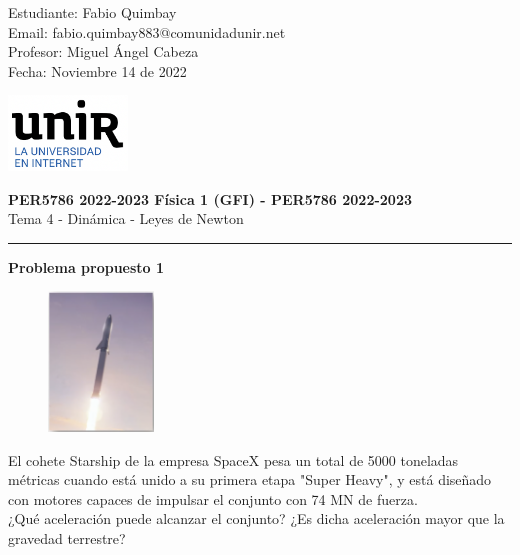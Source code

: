 \documentclass[11pt,letterpaper]{article}
\begin{document}
\pagestyle{plain}

\begin{flushleft}
Estudiante: Fabio Quimbay\\
Email: fabio.quimbay883@comunidadunir.net\\
Profesor: Miguel Ángel Cabeza\\
Fecha: Noviembre 14 de 2022\\
\end{flushleft}

\begin{flushright}\vspace{-20mm}
\includegraphics[height=2cm]{logo.png}
\end{flushright}
 
\begin{center}\vspace{0cm}
\textbf{\large PER5786 2022-2023  Física 1 (GFI) - PER5786 2022-2023}\\
 Tema 4 - Dinámica - Leyes de Newton
\end{center}

 
\rule{\linewidth}{0.1mm}

\bigskip
\bigskip

\textbf{Problema propuesto 1}\\

\begin{figure}
\begin{center}
\includegraphics[width=0.25\textwidth]{problema_1.png}
\end{center}
\end{figure}

El cohete Starship  de la empresa SpaceX  pesa un total de 5000 toneladas métricas cuando está unido a su primera etapa "Super Heavy", y está diseñado con motores capaces de impulsar el conjunto con 74 MN de fuerza. \\¿Qué aceleración puede alcanzar el conjunto? ¿Es dicha aceleración mayor que la gravedad terrestre?\\
\end{document}
